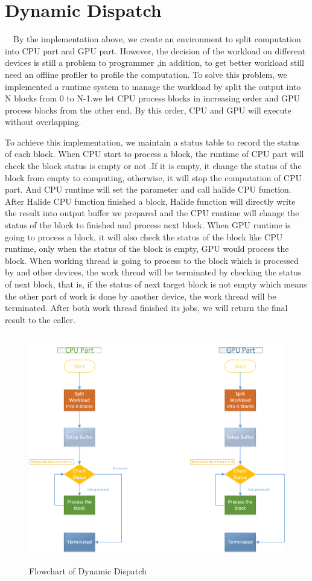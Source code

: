 \section{Dynamic Dispatch}

\quad \ \ By the implementation above, we create an environment to split computation into CPU part and GPU part. However, the decision of the workload on different devices is still  a problem to programmer ,in addition, to get better workload still need an offline profiler to profile the computation. To solve this problem, we implemented a runtime system to manage the workload by split the output into N blocks from 0 to N-1.we let CPU process blocks in increasing order and GPU process blocks from the other end. By this order, CPU and GPU will execute without overlapping.

	To achieve this implementation, we maintain a status table to record the status of each block. When CPU start to process a block, the runtime of CPU part will check the block status is empty or not .If it is empty, it change the status of the block from empty to computing, otherwise, it will stop the computation of CPU part. And CPU runtime will set the parameter and call halide CPU function. After Halide CPU function finished a block, Halide function will directly write the result into output buffer we prepared and the CPU runtime will change the status of the block to finished and process next block. When GPU runtime is going to process a block, it will also check the status of the block like CPU runtime, only when the status of the block is empty, GPU would process the block. When working thread is going to process to the block which is processed by and other devices, the work thread will be terminated by checking the status of next block, that is, if the status of next target block is not empty which means the other part of work is done by another device, the work thread will be terminated. After both work thread finished its jobs, we will return the final result to the caller.
\begin{figure}[H]
\centering
\includegraphics[height=10cm]{img/DynamicDispatchFlow.png}
\caption{Flowchart of Dynamic Dispatch}
\label{fig:my_label}
\end{figure}

